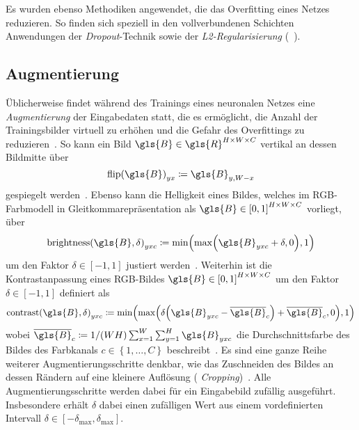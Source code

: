 Es wurden ebenso Methodiken angewendet, die das Overfitting eines Netzes reduzieren.
So finden sich speziell in den vollverbundenen Schichten Anwendungen der \emph{Dropout}-Technik sowie der \emph{L2-Regularisierung} (\vgl{}~\cite{dropout, weight_decay}).

\subsection{Augmentierung}
\label{augmentierung}

Üblicherweise findet während des Trainings eines neuronalen Netzes eine \emph{Augmentierung} der Eingabedaten statt, die es ermöglicht, die Anzahl der Trainingsbilder virtuell zu erhöhen und die Gefahr des Overfittings zu reduzieren~\cite{tensorflow}.
So kann \zB{} ein Bild $\gls{B} \in \gls{R}^{H \times W \times C}$ vertikal an dessen Bildmitte über
\begin{equation*}
  {\mathrm{flip}\left(\gls{B}\right)}_{yx} \coloneqq \gls{B}_{y,W-x}
\end{equation*}
gespiegelt werden~\cite{tensorflow}.
Ebenso kann die Helligkeit eines Bildes, welches im RGB-Farbmodell in Gleitkommarepräsentation als $\gls{B} \in {\left[0, 1\right]}^{H \times W \times C}$ vorliegt, über
\begin{equation*}
  {\mathrm{brightness}\left(\gls{B}, \delta \right)}_{yxc} \coloneqq \min \left( \max \left(\gls{B}_{yxc} + \delta, 0\right), 1\right)
\end{equation*}
um den Faktor $\delta \in \left[-1, 1\right]$ justiert werden~\cite{tensorflow}.
Weiterhin ist die Kontrastanpassung eines RGB-Bildes $\gls{B} \in {\left[0, 1\right]}^{H \times W \times C}$ um den Faktor $\delta \in \left[-1, 1\right]$ definiert als
\begin{equation*}
  {\mathrm{contrast}\left(\gls{B}, \delta\right)}_{yxc} \coloneqq \min \left( \max \left(\delta \left(\gls{B}_{yxc} - \overline{\gls{B}}_c\right) + \overline{\gls{B}}_c, 0\right), 1 \right)
\end{equation*}
wobei $\overline{\gls{B}}_c \coloneqq 1/\left(WH\right) \sum_{x = 1}^W \sum_{y = 1}^H \gls{B}_{yxc}$ die Durchschnittsfarbe des Bildes \bzgl{} des Farbkanals $c \in \left\{1, \ldots, C\right\}$ beschreibt~\cite{tensorflow}.
Es sind eine ganze Reihe weiterer Augmentierungsschritte denkbar, wie \zB{} das Zuschneiden des Bildes an dessen Rändern auf eine kleinere Auflösung (\engl{} \emph{Cropping})~\cite{tensorflow}.
Alle Augmentierungsschritte werden dabei für ein Eingabebild zufällig ausgeführt.
Insbesondere erhält $\delta$ dabei einen zufälligen Wert aus einem vordefinierten Intervall $\delta \in \left[-\delta_{\max}, \delta_{\max}\right]$.


